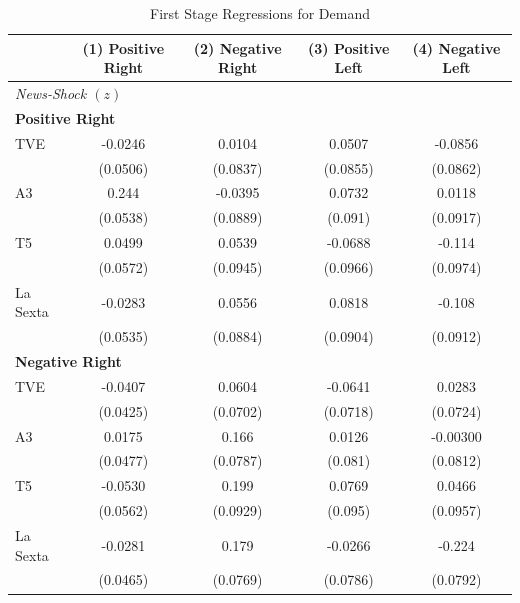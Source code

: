 \documentclass[12pt]{article}
\begin{document}
	\begin{table}[htbp]
		\centering
		\scriptsize
		\setlength{\tabcolsep}{4pt}
		\renewcommand{\arraystretch}{0.9}
		\caption{First Stage Regressions for Demand}
		\label{tab:first_stage}
		\begin{tabular}{lcccc}
			\hline
			\multicolumn{1}{c}{} & \textbf{(1) Positive Right} & \textbf{(2) Negative Right} & \textbf{(3) Positive Left} & \textbf{(4) Negative Left} \\
			\hline
			
			\multicolumn{5}{l}{\textit{News‐Shock $(z)$}}\\
			\hline
			
			\multicolumn{5}{l}{\textbf{Positive Right}}\\
			\hline
			TVE       & -0.0246       & 0.0104        & 0.0507        & -0.0856       \\
			& (0.0506)      & (0.0837)      & (0.0855)      & (0.0862)      \\
			A3        & 0.244\sym{***}& -0.0395       & 0.0732        & 0.0118        \\
			& (0.0538)      & (0.0889)      & (0.091)       & (0.0917)      \\
			T5        & 0.0499        & 0.0539        & -0.0688       & -0.114        \\
			& (0.0572)      & (0.0945)      & (0.0966)      & (0.0974)      \\
			La Sexta  & -0.0283       & 0.0556        & 0.0818        & -0.108        \\
			& (0.0535)      & (0.0884)      & (0.0904)      & (0.0912)      \\
			\hline
			
			\multicolumn{5}{l}{\textbf{Negative Right}}\\
			\hline
			TVE       & -0.0407       & 0.0604        & -0.0641       & 0.0283        \\
			& (0.0425)      & (0.0702)      & (0.0718)      & (0.0724)      \\
			A3        & 0.0175        & 0.166\sym{*}  & 0.0126        & -0.00300      \\
			& (0.0477)      & (0.0787)      & (0.081)       & (0.0812)      \\
			T5        & -0.0530       & 0.199\sym{*}  & 0.0769        & 0.0466        \\
			& (0.0562)      & (0.0929)      & (0.095)       & (0.0957)      \\
			La Sexta  & -0.0281       & 0.179\sym{**} & -0.0266       & -0.224\sym{**}\\
			& (0.0465)      & (0.0769)      & (0.0786)      & (0.0792)      \\
			\hline
			

\end{tabular}
\end{table}
\end{document}
